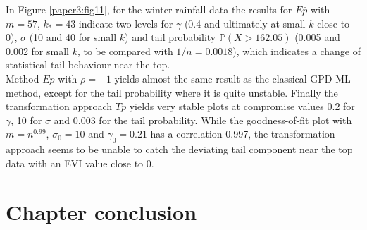  \noindent
In Figure \ref{paper3:fig11}, for the winter rainfall data the results for $E\bar{p}$ with $m=57$, $k_*=43$ indicate two levels for $\gamma$ (0.4 and ultimately at small $k$ close to 0), $\sigma$ (10 and 40 for small $k$) and tail probability $\mathbb{P}(X>162.05)$ (0.005 and 0.002 for small $k$, to be compared with $1/n=0.0018$), which indicates a change of statistical tail behaviour near the top. 
\\
Method $Ep$ with $\rho=-1$ yields almost the same result as the classical GPD-ML method, except for the tail probability where it is quite unstable. Finally the transformation approach $T\bar{p}$ yields very stable plots at compromise values 0.2 for $\gamma$, 10 for $\sigma$ and 0.003 for the tail probability. While the goodness-of-fit plot with $m=n^{0.99}$, $\sigma_0=10$ and $\gamma_0=0.21$ has a correlation 0.997, the transformation approach seems to be unable to catch the deviating tail component near the top data with an EVI value close to 0.

\section{Chapter conclusion} 

